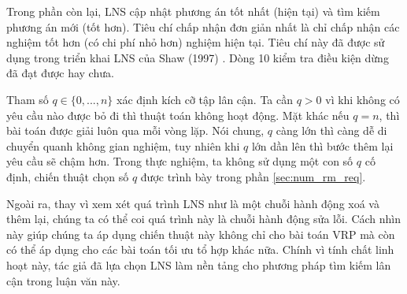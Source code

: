Trong phần còn lại, LNS cập nhật phương án tốt nhất (hiện tại) và tìm kiếm phương án mới (tốt hơn). Tiêu chí chấp nhận đơn giản nhất là chỉ chấp nhận các nghiệm tốt hơn (có chi phí nhỏ hơn) nghiệm hiện tại. Tiêu chí này đã được sử dụng trong triển khai LNS của Shaw (1997) \cite{shaw1997new}. Dòng 10 kiểm tra điều kiện dừng đã đạt được hay chưa.

Tham số $q \in \{0,...,n\}$ xác định kích cỡ tập lân cận. Ta cần $q > 0$ vì khi không có yêu cầu nào được bỏ đi thì thuật toán không hoạt động. Mặt khác nếu $q = n$, thì bài toán được giải luôn qua mỗi vòng lặp. Nói chung, $q$ càng lớn thì càng dễ di chuyển quanh không gian nghiệm, tuy nhiên khi $q$ lớn dần lên thì bước thêm lại yêu cầu sẽ chậm hơn. Trong thực nghiệm, ta không sử dụng một con số $q$ cố định, chiến thuật chọn số $q$ được trình bày trong phần \ref{sec:num_rm_req}.

Ngoài ra, thay vì xem xét quá trình LNS như là một chuỗi hành động xoá và thêm lại, chúng ta có thể coi quá trình này là chuỗi hành động sửa lỗi. Cách nhìn này giúp chúng ta áp dụng chiến thuật này không chỉ cho bài toán VRP mà còn có thể áp dụng cho các bài toán tối ưu tổ hợp khác nữa. Chính vì tính chất linh hoạt này, tác giả đã lựa chọn LNS làm nền tảng cho phương pháp tìm kiếm lân cận trong luận văn này.



